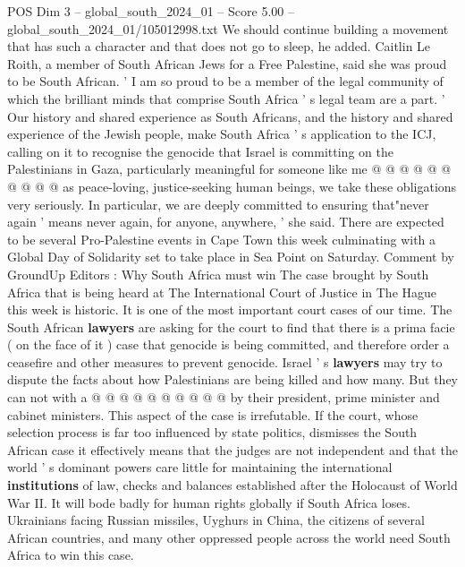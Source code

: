 \begin{textsample}{POS Dim 3 – global\_south\_2024\_01 – Score 5.00 – global\_south\_2024\_01/105012998.txt}
We should continue building a movement that has such a character and that does not go to sleep, he added.
Caitlin Le Roith, a member of South African Jews for a Free Palestine, said she was proud to be South African. ' I am so proud to be a member of the legal community of which the brilliant minds that comprise South Africa ' s legal team are a part. ' Our history and shared experience as South Africans, and the history and shared experience of the Jewish people, make South Africa ' s application to the ICJ, calling on it to recognise the genocide that Israel is committing on the Palestinians in Gaza, particularly meaningful for someone like me @ @ @ @ @ @ @ @ @ @ as peace-loving, justice-seeking human beings, we take these obligations very seriously.
In particular, we are deeply committed to ensuring that"never again ' means never again, for anyone, anywhere, ' she said.
There are expected to be several Pro-Palestine events in Cape Town this week culminating with a Global Day of Solidarity set to take place in Sea Point on Saturday.
Comment by GroundUp Editors : Why South Africa must win The case brought by South Africa that is being heard at The International Court of Justice in The Hague this week is historic.
It is one of the most important court cases of our time.
The South African \textbf{lawyers} are asking for the court to find that there is a prima facie ( on the face of it ) case that genocide is being committed, and therefore order a ceasefire and other measures to prevent genocide.
Israel ' s \textbf{lawyers} may try to dispute the facts about how Palestinians are being killed and how many.
But they can not with a @ @ @ @ @ @ @ @ @ @ by their president, prime minister and cabinet ministers.
This aspect of the case is irrefutable.
If the court, whose selection process is far too influenced by state politics, dismisses the South African case it effectively means that the judges are not independent and that the world ' s dominant powers care little for maintaining the international \textbf{institutions} of law, checks and balances established after the Holocaust of World War II.
It will bode badly for human rights globally if South Africa loses.
Ukrainians facing Russian missiles, Uyghurs in China, the citizens of several African countries, and many other oppressed people across the world need South Africa to win this case.

\end{textsample}
